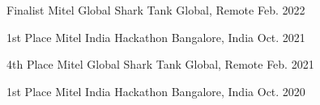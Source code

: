 
\begin{cvhonors}

  \cvhonor
    {Finalist} %
    {Mitel Global Shark Tank} %
    {Global, Remote} %
    {Feb. 2022} %

    
  \cvhonor
    {1st Place} %
    {Mitel India Hackathon} %
    {Bangalore, India} %
    {Oct. 2021} %

  \cvhonor
    {4th Place} %
    {Mitel Global Shark Tank} %
    {Global, Remote} %
    {Feb. 2021} %
    
  \cvhonor
    {1st Place} %
    {Mitel India Hackathon} %
    {Bangalore, India} %
    {Oct. 2020} %
    
\end{cvhonors}
